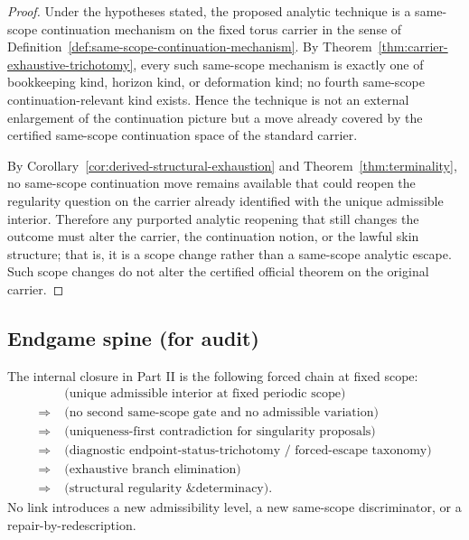 \begin{proof}
Under the hypotheses stated, the proposed analytic technique is a same-scope continuation mechanism
on the fixed torus carrier in the sense of Definition~\ref{def:same-scope-continuation-mechanism}.
By Theorem~\ref{thm:carrier-exhaustive-trichotomy}, every such same-scope mechanism is exactly one
of bookkeeping kind, horizon kind, or deformation kind; no fourth same-scope continuation-relevant
kind exists. Hence the technique is not an external enlargement of the continuation picture but a
move already covered by the certified same-scope continuation space of the standard carrier.

By Corollary~\ref{cor:derived-structural-exhaustion} and Theorem~\ref{thm:terminality}, no same-scope
continuation move remains available that could reopen the regularity question on the carrier already identified with the unique admissible interior.
Therefore any purported analytic reopening that still changes the outcome must alter the carrier, the
continuation notion, or the lawful skin structure; that is, it is a scope change rather than a same-scope
analytic escape. Such scope changes do not alter the certified official theorem on the original carrier.
\end{proof}

\subsection{Endgame spine (for audit)}
\begin{proposition}\label{prop:endgame-spine}
The internal closure in Part II is the following forced chain at fixed scope:
\begin{align*}
&\text{(unique admissible interior at fixed periodic scope)}\\
\Longrightarrow\;&\text{(no second same-scope gate and no admissible variation)}\\
\Longrightarrow\;&\text{(uniqueness-first contradiction for singularity proposals)}\\
\Longrightarrow\;&\text{(diagnostic endpoint-status-trichotomy / forced-escape taxonomy)}\\
\Longrightarrow\;&\text{(exhaustive branch elimination)}\\
\Longrightarrow\;&\text{(structural regularity \& determinacy).}
\end{align*}
No link introduces a new admissibility level, a new same-scope discriminator, or a repair-by-redescription.
\end{proposition}

